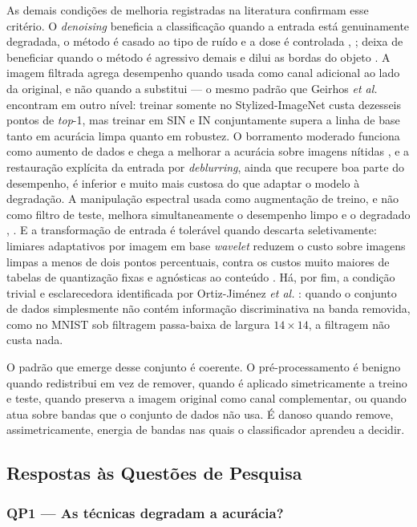 \documentclass[conference]{IEEEtran}
\begin{document}
As demais condições de melhoria registradas na literatura confirmam esse
critério. O \textit{denoising} beneficia a classificação quando a entrada está
genuinamente degradada, o método é casado ao tipo de ruído e a dose é
controlada \cite{b26}, \cite{b8}; deixa de beneficiar quando o método é
agressivo demais e dilui as bordas do objeto \cite{b9}. A imagem filtrada
agrega desempenho quando usada como canal adicional ao lado da original, e não
quando a substitui \cite{b9} --- o mesmo padrão que Geirhos \textit{et al.}
\cite{b16} encontram em outro nível: treinar somente no Stylized-ImageNet custa
dezesseis pontos de \textit{top}-1, mas treinar em SIN e IN conjuntamente
supera a linha de base tanto em acurácia limpa quanto em robustez. O borramento
moderado funciona como aumento de dados e chega a melhorar a acurácia sobre
imagens nítidas \cite{b4}, e a restauração explícita da entrada por
\textit{deblurring}, ainda que recupere boa parte do desempenho, é inferior e
muito mais custosa do que adaptar o modelo à degradação. A manipulação
espectral usada como augmentação de treino, e não como filtro de teste, melhora
simultaneamente o desempenho limpo e o degradado \cite{b28}, \cite{b29}. E a
transformação de entrada é tolerável quando descarta seletivamente: limiares
adaptativos por imagem em base \textit{wavelet} reduzem o custo sobre imagens
limpas a menos de dois pontos percentuais, contra os custos muito maiores de
tabelas de quantização fixas e agnósticas ao conteúdo \cite{b11}. Há, por fim,
a condição trivial e esclarecedora identificada por Ortiz-Jiménez \textit{et
al.} \cite{b23}: quando o conjunto de dados simplesmente não contém informação
discriminativa na banda removida, como no MNIST sob filtragem passa-baixa de
largura $14\times14$, a filtragem não custa nada.

O padrão que emerge desse conjunto é coerente. O pré-processamento é benigno
quando redistribui em vez de remover, quando é aplicado simetricamente a treino
e teste, quando preserva a imagem original como canal complementar, ou quando
atua sobre bandas que o conjunto de dados não usa. É danoso quando remove,
assimetricamente, energia de bandas nas quais o classificador aprendeu a
decidir.

\subsection{Respostas às Questões de Pesquisa}
\label{sec:rq}

\subsubsection{QP1 --- As técnicas degradam a acurácia?}
\end{document}
